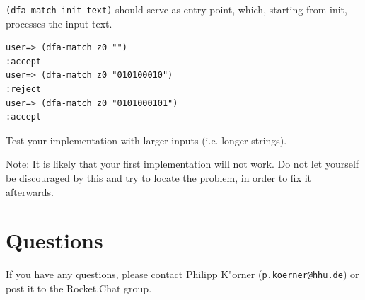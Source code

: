 \documentclass[11pt,a4paper]{article}
\begin{document}
\begin{exercise}[DFA]
\verb|(dfa-match init text)| should serve as entry point, which, starting from init, processes the input text.

\begin{verbatim}
user=> (dfa-match z0 "")
:accept
user=> (dfa-match z0 "010100010")
:reject
user=> (dfa-match z0 "0101000101")
:accept
\end{verbatim}


Test your implementation with larger inputs (i.e. longer strings).

Note: It is likely that your first implementation will not work.
Do not let yourself be discouraged by this and try to locate the problem,
in order to fix it afterwards.

\end{exercise}


	\section*{Questions}
	If you have any questions, please contact Philipp K"orner (\texttt{p.koerner@hhu.de}) or post it to the Rocket.Chat group.
\end{document}
